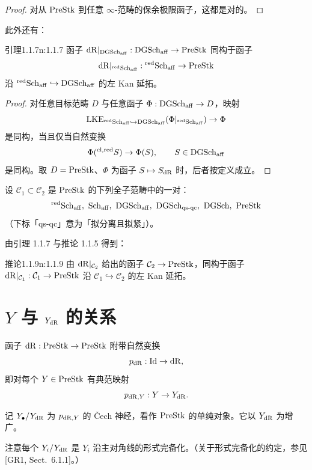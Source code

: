 \begin{proof}
对从 $\mathrm{PreStk}$ 到任意 $\infty$-范畴的保余极限函子，这都是对的。
\end{proof}

此外还有：

\begin{othm}{引理}{1.1.7}{n:1.1.7}
函子 $\mathrm{dR}|_{\mathrm{DGSch}_{\mathrm{aff}}}:\mathrm{DGSch}_{\mathrm{aff}}\to\mathrm{PreStk}$ 同构于函子
\[
\mathrm{dR}|_{{}^{\mathrm{red}}\mathrm{Sch}_{\mathrm{aff}}}:{}^{\mathrm{red}}\mathrm{Sch}_{\mathrm{aff}}\to\mathrm{PreStk}
\]
沿 ${}^{\mathrm{red}}\mathrm{Sch}_{\mathrm{aff}}\hookrightarrow\mathrm{DGSch}_{\mathrm{aff}}$ 的左 Kan 延拓。
\end{othm}

\begin{proof}
对任意目标范畴 $D$ 与任意函子 $\Phi:\mathrm{DGSch}_{\mathrm{aff}}\to D$，映射
\[
\mathrm{LKE}_{{}^{\mathrm{red}}\mathrm{Sch}_{\mathrm{aff}}\hookrightarrow\mathrm{DGSch}_{\mathrm{aff}}}(\Phi|_{{}^{\mathrm{red}}\mathrm{Sch}_{\mathrm{aff}}})\to\Phi
\]
是同构，当且仅当自然变换
\[
\Phi(^{\mathrm{cl,red}} S)\to\Phi(S),\qquad S\in\mathrm{DGSch}_{\mathrm{aff}}
\]
是同构。取 $D=\mathrm{PreStk}$、$\Phi$ 为函子 $S\mapsto S_{\mathrm{dR}}$ 时，后者按定义成立。
\end{proof}

设 $\mathcal{C}_1\subset\mathcal{C}_2$ 是 $\mathrm{PreStk}$ 的下列全子范畴中的一对：
\[
{}^{\mathrm{red}}\Sch_{\mathrm{aff}},\ \Sch_{\mathrm{aff}},\ \DGSch_{\mathrm{aff}},\ \DGSch_{\mathrm{qs\text{-}qc}},\ \DGSch,\ \PreStk
\]
（下标「qs-qc」意为「拟分离且拟紧」）。

由引理 1.1.7 与推论 1.1.5 得到：

\begin{othm}{推论}{1.1.9}{n:1.1.9}
由 $\mathrm{dR}|_{\mathcal{C}_2}$ 给出的函子 $\mathcal{C}_2\to\mathrm{PreStk}$，同构于函子 $\mathrm{dR}|_{\mathcal{C}_1}:\mathcal{C}_1\to\mathrm{PreStk}$ 沿 $\mathcal{C}_1\hookrightarrow\mathcal{C}_2$ 的左 Kan 延拓。
\end{othm}

\section{$Y$ 与 $Y_{\mathrm{dR}}$ 的关系}

函子 $\mathrm{dR}:\mathrm{PreStk}\to\mathrm{PreStk}$ 附带自然变换
\[
p_{\mathrm{dR}}:\mathrm{Id}\to\mathrm{dR},
\]
即对每个 $Y\in\mathrm{PreStk}$ 有典范映射
\[
p_{\mathrm{dR},Y}:Y\to Y_{\mathrm{dR}}.
\]

记 $Y_\bullet/Y_{\mathrm{dR}}$ 为 $p_{\mathrm{dR},Y}$ 的 Čech 神经，看作 $\mathrm{PreStk}$ 的单纯对象。它以 $Y_{\mathrm{dR}}$ 为增广。

注意每个 $Y_i/Y_{\mathrm{dR}}$ 是 $Y_i$ 沿主对角线的形式完备化。（关于形式完备化的约定，参见 [GR1, Sect.~6.1.1]。）

